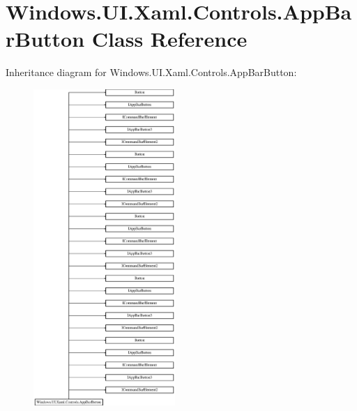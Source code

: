 \hypertarget{class_windows_1_1_u_i_1_1_xaml_1_1_controls_1_1_app_bar_button}{}\section{Windows.\+U\+I.\+Xaml.\+Controls.\+App\+Bar\+Button Class Reference}
\label{class_windows_1_1_u_i_1_1_xaml_1_1_controls_1_1_app_bar_button}
Inheritance diagram for Windows.\+U\+I.\+Xaml.\+Controls.\+App\+Bar\+Button\+:\begin{figure}[H]
\begin{center}
\leavevmode
\includegraphics[height=12.000000cm]{class_windows_1_1_u_i_1_1_xaml_1_1_controls_1_1_app_bar_button}
\end{center}
\end{figure}
